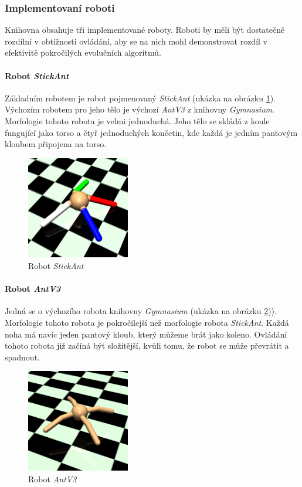 \subsubsection{Implementovaní roboti}
Knihovna obsahuje tři implementované roboty. Roboti by měli být dostatečně
rozdílní v obtížnosti ovládání, aby se na nich mohl demonstrovat rozdíl v
efektivitě pokročilých evolučních algoritmů.

\paragraph{Robot \emph{StickAnt}} \label{imp:robots.StickAnt}
Základním robotem je robot pojmenovaný \emph{StickAnt} (ukázka na obrázku
\ref{imp:fig:robots.StickAnt}). Výchozím robotem pro jeho tělo je výchozí
\emph{AntV3} z knihovny \emph{Gymnasium}. Morfologie tohoto robota je velmi
jednoduchá. Jeho tělo se skládá z koule fungující jako torso a čtyř
jednoduchých končetin, kde každá je jedním pantovým kloubem připojena na torso.
\begin{figure}[!htb]
    \centering
    \includegraphics[width=0.4\textwidth]{../img/crop_Basic-Ant.jpg}
    \caption{Robot \emph{StickAnt}}
    \label{imp:fig:robots.StickAnt}
\end{figure}

\paragraph{Robot \emph{AntV3}} \label{imp:robots.Ant}
Jedná se o výchozího robota knihovny \emph{Gymnasium} (ukázka na obrázku
\ref{imp:fig:robots.AntV3})). Morfologie tohoto robota je pokročilejší než
morfologie robota \emph{StickAnt}. Každá noha má navíc jeden pantový kloub,
který můžeme brát jako koleno. Ovládání tohoto robota již začíná být
složitější, kvůli tomu, že robot se může převrátit a spadnout.
\begin{figure}[!htb]
    \centering
    \includegraphics[width=0.4\textwidth]{../img/crop_Ant-v3.jpg}
    \caption{Robot \emph{AntV3}}
    \label{imp:fig:robots.AntV3}
\end{figure}

